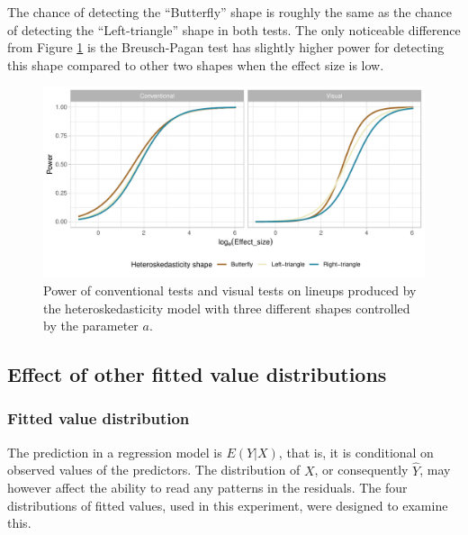 \documentclass[]{interact}
\theoremstyle{plain}%
\theoremstyle{definition}
\theoremstyle{remark}
\begin{document}
The chance of detecting the ``Butterfly'' shape is roughly the same as
the chance of detecting the ``Left-triangle'' shape in both tests. The
only noticeable difference from Figure \ref{fig:heter-power-uniform-a}
is the Breusch-Pagan test has slightly higher power for detecting this
shape compared to other two shapes when the effect size is low.

\begin{figure}

{\centering \includegraphics[width=1\linewidth]{paper_comparison_files/figure-latex/heter-power-uniform-a-1} 

}

\caption{Power of conventional tests and visual tests on lineups produced by the heteroskedasticity model with three different shapes controlled by the parameter $a$.}\label{fig:heter-power-uniform-a}
\end{figure}

\hypertarget{effect-of-other-fitted-value-distributions}{%
\subsection{Effect of other fitted value
distributions}\label{effect-of-other-fitted-value-distributions}}

\hypertarget{fitted-value-distribution}{%
\subsubsection{Fitted value
distribution}\label{fitted-value-distribution}}

The prediction in a regression model is \(E(Y|X)\), that is, it is
conditional on observed values of the predictors. The distribution of
\(X\), or consequently \(\hat{Y}\), may however affect the ability to
read any patterns in the residuals. The four distributions of fitted
values, used in this experiment, were designed to examine this.
\end{document}
